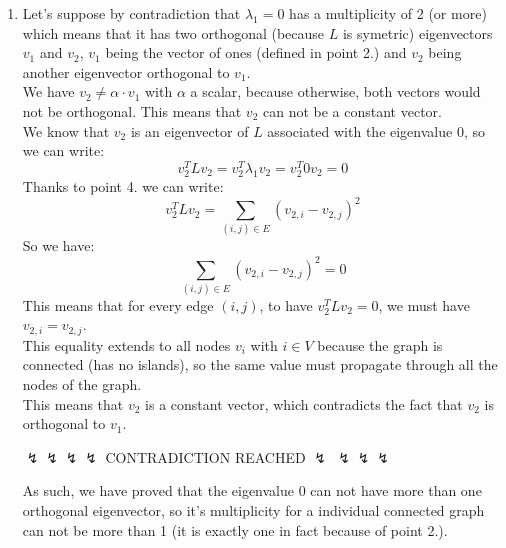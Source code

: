 \documentclass[11pt, legalpaper]{article}
\let\marvosymLightning\Lightning
\let\wasysymLightning\lightning
\let\stmaryrdLightning\lightning
\begin{document}
\begin{enumerate}
            \item Let's suppose by contradiction that $\lambda_1=0$ has a multiplicity of 2 (or more) which means that it has two orthogonal (because $L$ is symetric) eigenvectors $v_1$ and $v_2$, $v_1$ being the vector of ones (defined in point 2.) and $v_2$ being another eigenvector orthogonal to $v_1$.\\
            We have $v_2 \ne \alpha \cdot v_1$ with $\alpha$ a scalar, because otherwise, both vectors would not be orthogonal. This means that $v_2$ can not be a constant vector.\\
            We know that $v_2$ is an eigenvector of $L$ associated with the eigenvalue $0$, so we can write:
            $$v_2^T L v_2=v_2^T \lambda_1 v_2=v_2^T 0 v_2=0$$
            Thanks to point 4. we can write:
            $$v_2^T L v_2=\sum_{(i,j)\in E} (v_{2,i}-v_{2,j})^2$$
            So we have:
            $$\sum_{(i,j)\in E} (v_{2,i}-v_{2,j})^2=0$$
            This means that for every edge $(i,j)$, to have $v_2^TL v_2=0$, we must have $v_{2,i}=v_{2,j}$.\\
            This equality extends to all nodes $v_i$ with $i \in V$ because the graph is connected (has no islands), so the same value must propagate through all the nodes of the graph.\\
            This means that $v_2$ is a constant vector, which contradicts the fact that $v_2$ is orthogonal to $v_1$.
            \begin{center}
                \wasysymLightning \marvosymLightning $\stmaryrdLightning$\wasysymLightning \marvosymLightning $\stmaryrdLightning$\wasysymLightning \marvosymLightning $\stmaryrdLightning$\wasysymLightning \marvosymLightning $\stmaryrdLightning$ CONTRADICTION REACHED \wasysymLightning \marvosymLightning $\stmaryrdLightning$ \wasysymLightning \marvosymLightning $\stmaryrdLightning$\wasysymLightning \marvosymLightning $\stmaryrdLightning$\wasysymLightning \marvosymLightning $\stmaryrdLightning$
            \end{center}
            As such, we have proved that the eigenvalue $0$ can not have more than one orthogonal eigenvector, so it's multiplicity for a individual connected graph can not be more than 1 (it is exactly one in fact because of point 2.).

\end{enumerate}
\end{document}
